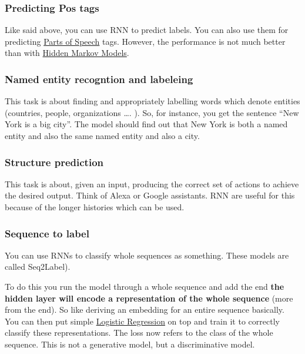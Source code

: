 \documentclass[
  11pt,
  british,
]{article}
\begin{document}
\hypertarget{predicting-pos-tags}{%
\subsubsection{Predicting Pos tags}\label{predicting-pos-tags}}

Like said above, you can use RNN to predict labels. You can also use
them for predicting \href{Languages/Parts\%20of\%20Speech.md}{Parts of
Speech} tags. However, the performance is not much better than with
\href{Prediction/Hidden\%20Markov\%20Models.md}{Hidden Markov Models}.

\hypertarget{named-entity-recogntion-and-labeleing}{%
\subsubsection{Named entity recogntion and
labeleing}\label{named-entity-recogntion-and-labeleing}}

This task is about finding and appropriately labelling words which
denote entities (countries, people, organizations \ldots. ). So, for
instance, you get the sentence ``New York is a big city''. The model
should find out that New York is both a named entity and also the same
named entity and also a city.

\hypertarget{structure-prediction}{%
\subsubsection{Structure prediction}\label{structure-prediction}}

This task is about, given an input, producing the correct set of actions
to achieve the desired output. Think of Alexa or Google assistants. RNN
are useful for this because of the longer histories which can be used.

\hypertarget{sequence-to-label}{%
\subsubsection{Sequence to label}\label{sequence-to-label}}

You can use RNNs to classify whole sequences as something. These models
are called Seq2Label).

To do this you run the model through a whole sequence and add the end
\textbf{the hidden layer will encode a representation of the whole
sequence} (more from the end). So like deriving an embedding for an
entire sequence basically. You can then put simple
\href{Classification/Logistic\%20Regression.md}{Logistic Regression} on
top and train it to correctly classify these representations. The loss
now refers to the class of the whole sequence. This is not a generative
model, but a discriminative model.
\end{document}
